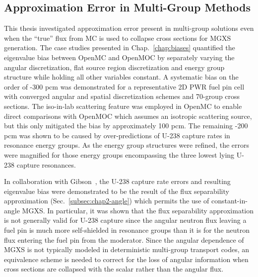 \subsection{Approximation Error in Multi-Group Methods}
\label{subsec:chap12-approx-error}

This thesis investigated approximation error present in multi-group solutions even when the ``true'' flux from \ac{MC} is used to collapse cross sections for \ac{MGXS} generation. The case studies presented in Chap.~\ref{chap:biases} quantified the eigenvalue bias between OpenMC and OpenMOC by separately varying the angular discretization, flat source region discretization and energy group structure while holding all other variables constant. A systematic bias on the order of -300 \ac{pcm} was demonstrated for a representative 2D \ac{PWR} fuel pin cell with converged angular and spatial discretization schemes and 70-group cross sections. The iso-in-lab scattering feature was employed in OpenMC to enable direct comparisons with OpenMOC which assumes an isotropic scattering source, but this only mitigated the bias by approximately 100 \ac{pcm}. The remaining -200 \ac{pcm} was shown to be caused by over-predictions of U-238 capture rates in resonance energy groups. As the energy group structures were refined, the errors were magnified for those energy groups encompassing the three lowest lying U-238 capture resonances.


In collaboration with Gibson~\cite{gibson2016thesis}, the U-238 capture rate errors and resulting eigenvalue bias were demonstrated to be the result of the flux separability approximation (Sec.~\ref{subsec:chap2-angle}) which permits the use of constant-in-angle \ac{MGXS}. In particular, it was shown that the flux separability approximation is not generally valid for U-238 capture since the angular neutron flux leaving a fuel pin is much more self-shielded in resonance groups than it is for the neutron flux entering the fuel pin from the moderator. Since the angular dependence of \ac{MGXS} is not typically modeled in deterministic multi-group transport codes, an equivalence scheme is needed to correct for the loss of angular information when cross sections are collapsed with the scalar rather than the angular flux. 

